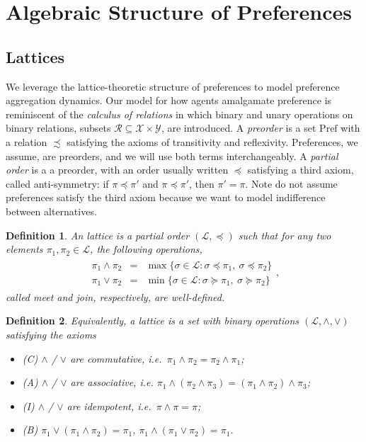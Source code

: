 \documentclass[conference]{ieeeconf}
\renewcommand{\P}{\mathrm{Pref}}
\renewcommand{\L}{\mathcal{L}}
\newcommand{\join}{\vee}
\newcommand{\meet}{\wedge}
\newtheorem{definition}{Definition}
\begin{document}
\section{Algebraic Structure of Preferences}

\subsection{Lattices}
We leverage the lattice-theoretic \cite{birkhoff1940} structure of preferences to model preference aggregation dynamics. Our model for how agents amalgamate preference is reminiscent of the \emph{calculus of relations} \cite{tarski1941} in which binary and unary operations on binary relations, subsets $\mathcal{R} \subseteq \mathcal{X} \times \mathcal{Y}$, are introduced. A \emph{preorder} is a set $\P$ with a relation $\precsim$ satisfying the axioms of transitivity and reflexivity. Preferences, we assume, are preorders, and we will use both terms interchangeably. A \emph{partial order} is a a preorder, with an order usually written $\preceq$ satisfying a third axiom, called anti-symmetry: if $\pi \preceq \pi'$ and $\pi \preceq \pi'$, then $\pi' = \pi$. Note do not assume preferences satisfy the third axiom because we want to model indifference between alternatives.
 
\begin{definition}
    An \emph{lattice} is a partial order $(\L, \preceq)$ such that for any two elements $\pi_1, \pi_2 \in \L$, the following operations,
    \begin{align*}
        \begin{aligned}
        \pi_1 \meet \pi_2 &=& \max\{ \sigma \in \L: \sigma \preceq \pi_1,~\sigma \preceq \pi_2 \} \\
        \pi_1 \join \pi_2 &=& \min\{ \sigma \in \L: \sigma \succeq \pi_1,~\sigma \succeq \pi_2 \}        
        \end{aligned},
    \end{align*}
    called \emph{meet} and \emph{join}, respectively, are well-defined. 
\end{definition}
\begin{definition}
    Equivalently, a \emph{lattice} is a set with binary operations $(\L, \meet, \join)$ satisfying the axioms
    \begin{itemize}
        \item[](C) $\meet$ / $\join$ are commutative, i.e.~$\pi_1 \meet \pi_2 = \pi_2 \meet \pi_1$;
        \item[] (A) $\meet$ / $\join$ are associative, i.e. {\small $\pi_1 \meet (\pi_2 \meet \pi_3) = (\pi_1 \meet \pi_2) \meet \pi_3$};
        \item[](I) $\meet$ / $\join$ are idempotent, i.e.~$\pi \meet \pi = \pi$;
        \item[] (B) $\pi_1 \join \left( \pi_1 \meet \pi_2 \right) = \pi_1$, $\pi_1 \meet \left( \pi_1 \join \pi_2 \right) = \pi_1$.
    \end{itemize}
\end{definition}
\end{document}
